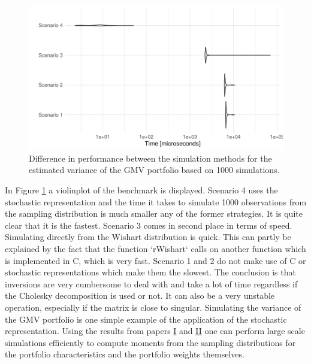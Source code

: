 \documentclass[12pt, twoside]{book}\usepackage{knitr}
\begin{document}
\begin{knitrout}\small
{}\color{fgcolor}\begin{figure}

{\centering \includegraphics[width=\maxwidth]{figure/microbenchmark_output-1} 

}

\caption[Difference in performance between the simulation methods for the estimated variance of the GMV portfolio based on 1000 simulations]{Difference in performance between the simulation methods for the estimated variance of the GMV portfolio based on 1000 simulations.}\label{fig:microbenchmark_output}
\end{figure}

\end{knitrout}

In Figure \ref{fig:microbenchmark_output} a violinplot of the benchmark is displayed.
Scenario 4 uses the stochastic representation and the time it takes to simulate 1000 observations from the sampling distribution is much smaller any of the former strategies.
It is quite clear that it is the fastest.
Scenario 3 comes in second place in terms of speed.
Simulating directly from the Wishart distribution is quick.
This can partly be explained by the fact that the function `rWishart` calls on another function which is implemented in C, which is very fast.
Scenario 1 and 2 do not make use of C or stochastic representations which make them the slowest.
The conclusion is that inversions are very cumbersome to deal with and take a lot of time regardless if the Cholesky decomposition is used or not.
It can also be a very unstable operation, especially if the matrix is close to singular.
Simulating the variance of the GMV portfolio is one simple example of the application of the stochastic representation.
Using the results from papers \hyperref[sec:paper1]{I} and \hyperref[sec:paper2]{II} one can perform large scale simulations efficiently to compute moments from the sampling distributions for the portfolio characteristics and the portfolio weights themselves.
\end{document}
